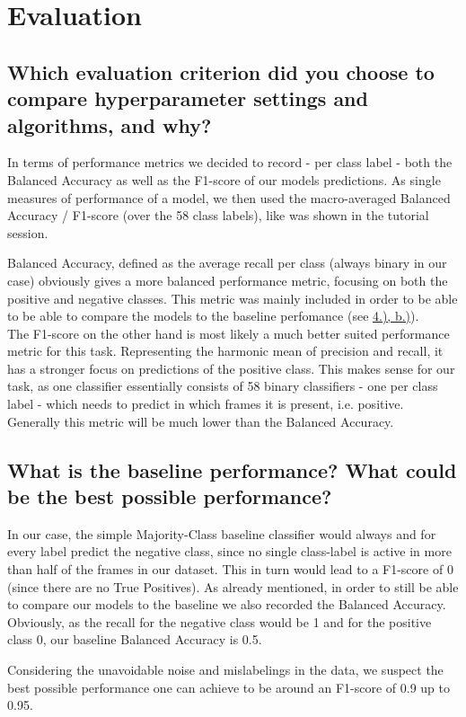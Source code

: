 
\section{Evaluation}
\label{sec:Evaluation}






\subsection{Which evaluation criterion did you choose to compare hyperparameter settings and algorithms, and why? }
\label{sec:Evaluation:a}

In terms of performance metrics we decided to record - per class label - both the Balanced Accuracy as well as the F1-score of our models predictions. As single measures of performance of a model, we then used the macro-averaged Balanced Accuracy / F1-score (over the 58 class labels), like was shown in the tutorial session. 

Balanced Accuracy, defined as the average recall per class (always binary in our case) obviously gives a more balanced performance metric, focusing on both the positive and negative classes. This metric was mainly included in order to be able to be able to compare the models to the baseline perfomance (see \hyperref[sec:Evaluation:b]{4.), b.)}).\\
The F1-score on the other hand is most likely a much better suited performance metric for this task. Representing the harmonic mean of precision and recall, it has a stronger focus on predictions of the positive class. This makes sense for our task, as one classifier essentially consists of 58 binary classifiers - one per class label - which needs to predict in which frames it is present, i.e. positive. Generally this metric will be much lower than the Balanced Accuracy.


\subsection{What is the baseline performance? What could be the best possible performance? }
\label{sec:Evaluation:b}

In our case, the simple Majority-Class baseline classifier would always and for every label predict the negative class, since no single class-label is active in more than half of the frames in our dataset. This in turn would lead to a F1-score of 0 (since there are no True Positives). As already mentioned, in order to still be able to compare our models to the baseline we also recorded the Balanced Accuracy. Obviously, as the recall for the negative class would be 1 and for the positive class 0, our baseline Balanced Accuracy is 0.5.

Considering the unavoidable noise and mislabelings in the data, we suspect the best possible performance one can achieve to be around an F1-score of 0.9 up to 0.95.



